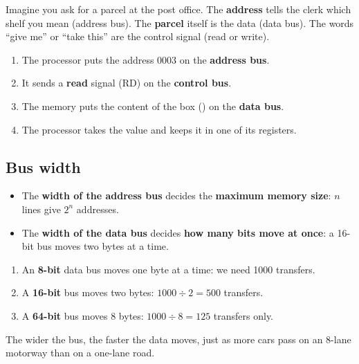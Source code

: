 \begin{tashbih}
    Imagine you ask for a parcel at the post office. The \textbf{address} tells the clerk which shelf you mean
    (address bus). The \textbf{parcel} itself is the data (data bus). The words ``give me'' or ``take this''
    are the control signal (read or write).
\end{tashbih}

\begin{khatwa}
    \begin{enumerate}
        \item The processor puts the address 0003 on the \textbf{address bus}.
        \item It sends a \textbf{read} signal (RD) on the \textbf{control bus}.
        \item The memory puts the content of the box () on the \textbf{data bus}.
        \item The processor takes the value  and keeps it in one of its registers.
    \end{enumerate}
\end{khatwa}

\subsection{Bus width}
\begin{itemize}
    \item The \textbf{width of the address bus} decides the \textbf{maximum memory size}: $n$ lines give $2^n$ addresses.
    \item The \textbf{width of the data bus} decides \textbf{how many bits move at once}: a 16-bit bus moves two bytes at a time.
\end{itemize}

\begin{khatwa}
    \begin{enumerate}
        \item An \textbf{8-bit} data bus moves one byte at a time: we need 1000 transfers.
        \item A \textbf{16-bit} bus moves two bytes: $1000 \div 2 = 500$ transfers.
        \item A \textbf{64-bit} bus moves 8 bytes: $1000 \div 8 = 125$ transfers only.
    \end{enumerate}
    The wider the bus, the faster the data moves, just as more cars pass on an 8-lane motorway than on a one-lane road.
\end{khatwa}

